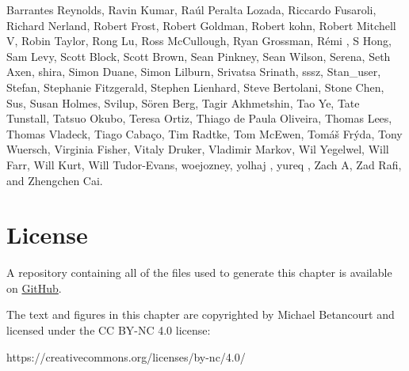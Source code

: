 \documentclass[
  letterpaper,
  DIV=11,
  numbers=noendperiod]{scrartcl}
\begin{document}
Barrantes Reynolds, Ravin Kumar, Raúl Peralta Lozada, Riccardo Fusaroli,
Richard Nerland, Robert Frost, Robert Goldman, Robert kohn, Robert
Mitchell V, Robin Taylor, Rong Lu, Ross McCullough, Ryan Grossman, Rémi
, S Hong, Sam Levy, Scott Block, Scott Brown, Sean Pinkney, Sean Wilson,
Serena, Seth Axen, shira, Simon Duane, Simon Lilburn, Srivatsa Srinath,
sssz, Stan\_user, Stefan, Stephanie Fitzgerald, Stephen Lienhard, Steve
Bertolani, Stone Chen, Sus, Susan Holmes, Svilup, Sören Berg, Tagir
Akhmetshin, Tao Ye, Tate Tunstall, Tatsuo Okubo, Teresa Ortiz, Thiago de
Paula Oliveira, Thomas Lees, Thomas Vladeck, Tiago Cabaço, Tim Radtke,
Tom McEwen, Tomáš Frýda, Tony Wuersch, Virginia Fisher, Vitaly Druker,
Vladimir Markov, Wil Yegelwel, Will Farr, Will Kurt, Will Tudor-Evans,
woejozney, yolhaj , yureq , Zach A, Zad Rafi, and Zhengchen Cai.

\hypertarget{license}{%
\section*{License}\label{license}}

A repository containing all of the files used to generate this chapter
is available on
\href{https://github.com/betanalpha/quarto_chapters/tree/main/1_probability_on_finite_sets}{GitHub}.

The text and figures in this chapter are copyrighted by Michael
Betancourt and licensed under the CC BY-NC 4.0 license:

https://creativecommons.org/licenses/by-nc/4.0/
\end{document}
